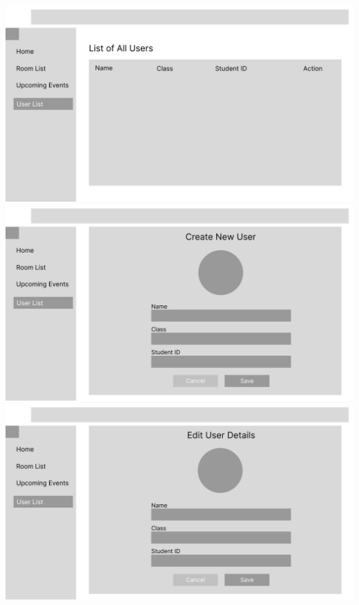 \documentclass[12pt,titlepage,a4paper]{report}
\begin{document}
\begin{center}
        \includegraphics[width=\textwidth]{images/figures/UIUX/User_List_(Atmin).png}\\
        \includegraphics[width=\textwidth]{images/figures/UIUX/Create_New_User_(Atmin).png}\\
        \includegraphics[width=\textwidth]{images/figures/UIUX/Edit_User_(Atmin).png}\\
    \end{center}
    \newpage
\end{document}
